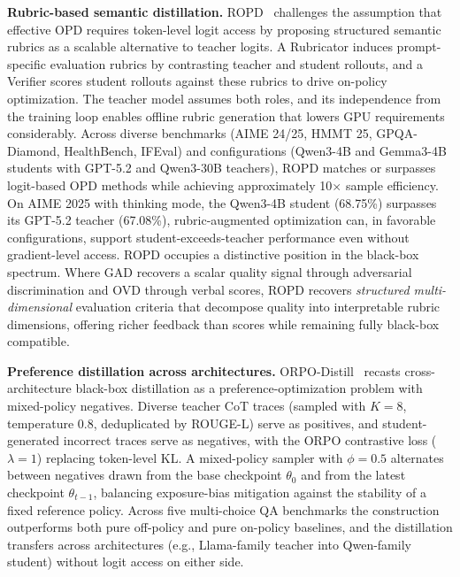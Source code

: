 \documentclass{article} %
\begin{document}
\textbf{Rubric-based semantic distillation.} ROPD~\citep{2605.07396} challenges the assumption that effective OPD requires token-level logit access by proposing structured semantic rubrics as a scalable alternative to teacher logits. A Rubricator induces prompt-specific evaluation rubrics by contrasting teacher and student rollouts, and a Verifier scores student rollouts against these rubrics to drive on-policy optimization. The teacher model assumes both roles, and its independence from the training loop enables offline rubric generation that lowers GPU requirements considerably. Across diverse benchmarks (AIME 24/25, HMMT 25, GPQA-Diamond, HealthBench, IFEval) and configurations (Qwen3-4B and Gemma3-4B students with GPT-5.2 and Qwen3-30B teachers), ROPD matches or surpasses logit-based OPD methods while achieving approximately 10$\times$ sample efficiency. On AIME 2025 with thinking mode, the Qwen3-4B student (68.75\%) surpasses its GPT-5.2 teacher (67.08\%), rubric-augmented optimization can, in favorable configurations, support student-exceeds-teacher performance even without gradient-level access. ROPD occupies a distinctive position in the black-box spectrum. Where GAD recovers a scalar quality signal through adversarial discrimination and OVD through verbal scores, ROPD recovers \emph{structured multi-dimensional} evaluation criteria that decompose quality into interpretable rubric dimensions, offering richer feedback than scores while remaining fully black-box compatible.

\textbf{Preference distillation across architectures.} ORPO-Distill~\citep{2509.25100} recasts cross-architecture black-box distillation as a preference-optimization problem with mixed-policy negatives. Diverse teacher CoT traces (sampled with $K{=}8$, temperature $0.8$, deduplicated by ROUGE-L) serve as positives, and student-generated incorrect traces serve as negatives, with the ORPO contrastive loss ($\lambda{=}1$) replacing token-level KL. A mixed-policy sampler with $\phi{=}0.5$ alternates between negatives drawn from the base checkpoint $\theta_0$ and from the latest checkpoint $\theta_{t-1}$, balancing exposure-bias mitigation against the stability of a fixed reference policy. Across five multi-choice QA benchmarks the construction outperforms both pure off-policy and pure on-policy baselines, and the distillation transfers across architectures (e.g., Llama-family teacher into Qwen-family student) without logit access on either side.
\end{document}

